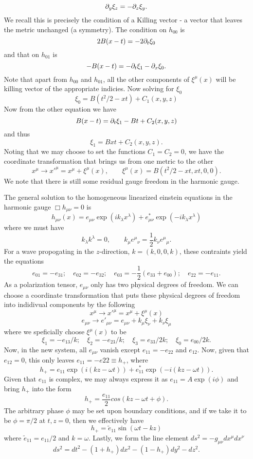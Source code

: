 \documentclass[10pt,letterpaper]{article}
\begin{document}
\[
	\partial_y \xi_z = -\partial_z \xi_y.
\]
We recall this is precisely the condition of a Killing vector - a vector that leaves the metric unchanged (a symmetry). The condition on $h_{00}$ is
\[
	2B(x-t) = -2\partial_t \xi_0
\]
and that on $h_{01}$ is
\[
	-B(x-t) = -\partial_t \xi_1 -\partial_x \xi_0.
\]
Note that  apart from $h_{00}$ and $h_{01}$, all the other components of $\xi^\mu(x)$ will be killing vector of the appropriate indicies. 
Now solving for $\xi_0$
\[
	\xi_{0}  = B(t^2/2-xt)+C_1(x,y,z)
\]
Now from the other equation we have
\[
	B(x-t) = \partial_t \xi_1 -Bt + C_2(x,y,z)
\]
and thus
\[
	\xi_1 = Bxt+C_2(x,y,z).
\]
Noting that we may choose to set the functions $C_1 = C_2 = 0$, we have the coordinate transformation that brings us from one metric to the other
\[
		x^\mu \to x'^\mu = x^\mu + \xi^\mu(x),\qquad \xi^\mu(x) = B(t^2/2-xt,xt,0,0).
\]
We note that there is still some residual gauge freedom in the harmonic gauge. \\
\eenum
\item
\benum
\item
The general solution to the homogeneous linearized einstein equations in the harmonic gauge $\Box h_{\mu\nu} = 0$ is
\[
	h_{\mu\nu}(x) = e_{\mu\nu} \exp(ik_\lambda x^\lambda) + e^*_{\mu\nu} \exp(-ik_\lambda x^\lambda)
\]
where we must have
\[
	k_\lambda k^\lambda = 0,\qquad k_{\mu}e^\mu{}_\nu = \frac12 k_\nu e^\mu{}_\mu.
\]
For a wave propogating in the $z$-direction, $k = (k,0,0,k)$, these contraints yield the equations
\[
	e_{01} = -e_{31};\quad e_{02} = -e_{32};\quad e_{03} = -\frac12(e_{33}+e_00);\quad e_{22} = -e_{11}.
\]
As a polarization tensor, $e_{\mu\nu}$ only has two physical degrees of freedom. We can choose a coordinate transformation that puts these physical degrees of freedom into indidivual components by the following 
\[
	x^\mu \to x'^\mu = x^\mu + \xi^\mu(x)
\]
\[
	e_{\mu\nu} \to e'_{\mu\nu} = e_{\mu\nu} + k_\mu \xi_\nu + k_\nu \xi_\mu
\]
where we speficially choose $\xi^\mu(x)$ to be
\[
	\xi_1 = -e_{13}/k;\quad \xi_2 = -e_{23}/k;\quad \xi_3 = e_{33}/2k;\quad \xi_0 = e_{00}/2k.
\]
Now, in the new system, all $e_{\mu\nu}$ vanish except $e_{11} = -e_{22}$ and $e_{12}$. Now, given that $e_{12} = 0$, this only leaves
$e_11 = -e22\equiv h_+$, where
\[
	h_+ = e_{11}\exp(i(kz-\omega t)) + e^*_{11} \exp(-i(kz-\omega t)).
\]
Given that $e_{11}$ is complex, we may always express it as $e_{11} = A\exp(i\phi)$ and bring $h_+$ into the form
\[
	h_+ = \frac{e_{11}}{2} cos(kz-\omega t+\phi).
\]
The arbitrary phase $\phi$ may be set upon boundary conditions, and if we take it to be $\phi = \pi/2$ at $t,z = 0$, then we effectively have
\[
	h_+ = \tilde e_{11}\sin(\omega t- kz)
\]
where $\tilde e_{11} = e_{11}/2$ and $k=\omega$. Lastly, we form the line element $ds^2 = -g_{\mu\nu}dx^\mu dx^\nu$
\[
	ds^2 = dt^2 - (1+h_+)dx^2 - (1-h_+)dy^2 -dz^2.
\]
\end{document}
